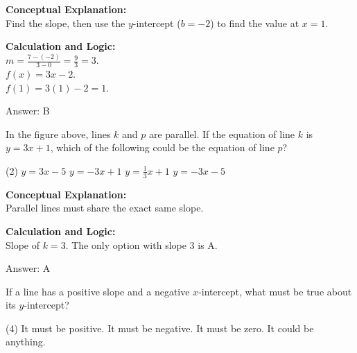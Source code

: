 \documentclass[11pt,paper=a4,answers]{exam}
\begin{document}
\begin{questions}
\begin{solution}
\textbf{Conceptual Explanation:} \\
Find the slope, then use the $y$-intercept ($b = -2$) to find the value at $x=1$.

\vspace{10pt}
\textbf{Calculation and Logic:} \\
$m = \frac{7 - (-2)}{3 - 0} = \frac{9}{3} = 3$. \\
$f(x) = 3x - 2$. \\
$f(1) = 3(1) - 2 = 1$.

\vspace{15pt}
Answer: \colorbox{yellow!100}{B}
\end{solution}

\vspace{20pt}

\question

In the figure above, lines $k$ and $p$ are parallel. If the equation of line $k$ is $y = 3x + 1$, which of the following could be the equation of line $p$?
\begin{tasks}(2)
    \task $y = 3x - 5$
    \task $y = -3x + 1$
    \task $y = \frac{1}{3}x + 1$
    \task $y = -3x - 5$
\end{tasks}

\begin{solution}
\textbf{Conceptual Explanation:} \\
Parallel lines must share the exact same slope.

\vspace{10pt}
\textbf{Calculation and Logic:} \\
Slope of $k = 3$. The only option with slope 3 is A.

\vspace{15pt}
Answer: \colorbox{yellow!100}{A}
\end{solution}

\vspace{20pt}

\question
If a line has a positive slope and a negative $x$-intercept, what must be true about its $y$-intercept?
\begin{tasks}(4)
    \task It must be positive.
    \task It must be negative.
    \task It must be zero.
    \task It could be anything.
\end{tasks}


\end{questions}
\end{document}
